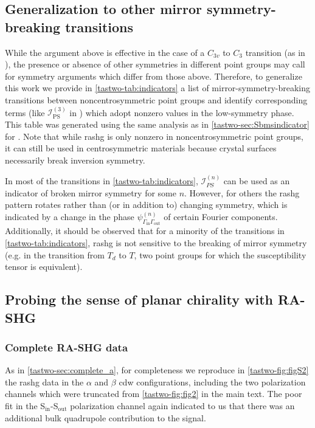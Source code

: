 \subsection{Generalization to other mirror symmetry-breaking transitions}

While the argument above is effective in the case of a $C_{3v}$ to $C_3$ transition (as in \tastwo), the presence or absence of other symmetries in different point groups may call for symmetry arguments which differ from those above.
Therefore, to generalize this work we provide in \cref{tastwo-tab:indicators} a list of mirror-symmetry-breaking transitions between noncentrosymmetric point groups and identify corresponding terms (like $\mathscr{I}_\mathrm{PS}^{(3)}$ in \tastwo) which adopt nonzero values in the low-symmetry phase.
This table was generated using the same analysis as in \cref{tastwo-sec:Sbmsindicator} for \tastwo. 
Note that while \gls{rashg} is only nonzero in noncentrosymmetric point groups, it can still be used in centrosymmetric materials because crystal surfaces necessarily break inversion symmetry.

In most of the transitions in \cref{tastwo-tab:indicators}, $\mathscr{I}_{PS}^{(n)}$ can be used as an indicator of broken mirror symmetry for some $n$.
However, for others the \gls{rashg} pattern rotates rather than (or in addition to) changing symmetry, which is indicated by a change in the phase $\psi^{(n)}_{\Gamma_\mathrm{in}\Gamma_\mathrm{out}}$ of certain Fourier components.
Additionally, it should be observed that for a minority of the transitions in \cref{tastwo-tab:indicators}, \gls{rashg} is not sensitive to the breaking of mirror symmetry (e.g. in the transition from $T_d$ to $T$, two point groups for which the susceptibility tensor is equivalent).

\subsection{Probing the sense of planar chirality with RA-SHG}
\subsubsection{Complete RA-SHG data\label{tastwo-sec:complete_b}}
As in \cref{tastwo-sec:complete_a}, for completeness we reproduce in \cref{tastwo-fig:figS2} the \gls{rashg} data in the $\alpha$ and $\beta$ \gls{cdw} configurations, including the two polarization channels which were truncated from \cref{tastwo-fig:fig2} in the main text.
The poor fit in the S$_\mathrm{in}$-S$_\mathrm{out}$ polarization channel again indicated to us that there was an additional bulk quadrupole contribution to the signal.

